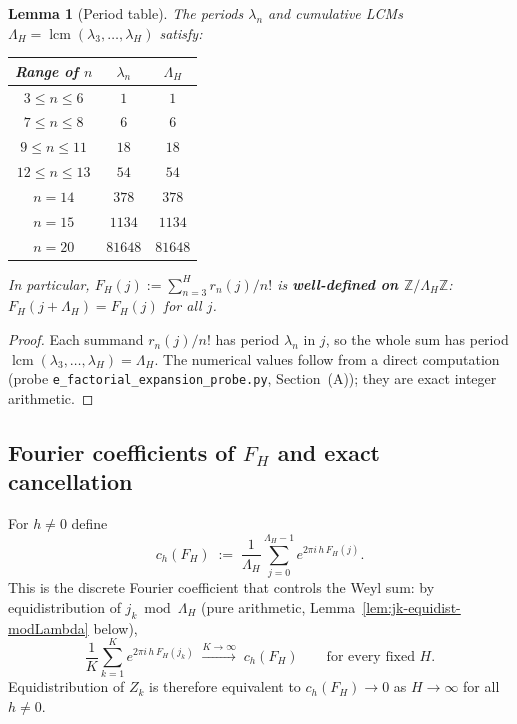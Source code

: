 \documentclass[
]{article}
\newtheorem{lemma}[theorem]{Lemma}
\begin{document}
\begin{lemma}[Period table]\label{lem:period-table}
The periods $\lambda_n$ and cumulative LCMs $\Lambda_H =
\operatorname{lcm}(\lambda_3,\ldots,\lambda_H)$ satisfy:

\begin{center}
\begin{tabular}{ccc}
\toprule
Range of $n$ & $\lambda_n$ & $\Lambda_H$ \\
\midrule
$3\le n\le 6$  & $1$  & $1$    \\
$7\le n\le 8$  & $6$  & $6$    \\
$9\le n\le 11$ & $18$ & $18$   \\
$12\le n\le 13$& $54$ & $54$   \\
$n=14$         & $378$& $378$  \\
$n=15$         & $1134$& $1134$\\
$n=20$         & $81648$& $81648$\\
\bottomrule
\end{tabular}
\end{center}

In particular, $F_H(j) := \sum_{n=3}^{H} r_n(j)/n!$ is
\textbf{well-defined on $\mathbb{Z}/\Lambda_H\mathbb{Z}$}:
$F_H(j+\Lambda_H) = F_H(j)$ for all $j$.
\end{lemma}

\begin{proof}
Each summand $r_n(j)/n!$ has period $\lambda_n$ in $j$, so the whole
sum has period $\operatorname{lcm}(\lambda_3,\ldots,\lambda_H) = \Lambda_H$.
The numerical values follow from a direct computation
(probe \texttt{e\_factorial\_expansion\_probe.py}, Section~(A));
they are exact integer arithmetic.
\end{proof}

\subsection{Fourier coefficients of $F_H$ and exact cancellation}
\label{sec:fourier-fH}

For $h\ne 0$ define
\begin{equation}\label{eq:fourier-fH-def}
  c_h(F_H) \;:=\; \frac{1}{\Lambda_H}\sum_{j=0}^{\Lambda_H-1}
    e^{2\pi i\,h\,F_H(j)}.
\end{equation}
This is the discrete Fourier coefficient that controls the Weyl sum:
by equidistribution of $j_k\bmod\Lambda_H$ (pure arithmetic,
Lemma~\ref{lem:jk-equidist-modLambda} below),
\[
  \frac{1}{K}\sum_{k=1}^K e^{2\pi i\,h\,F_H(j_k)}
  \;\xrightarrow{K\to\infty}\; c_h(F_H)
  \qquad\text{for every fixed }H.
\]
Equidistribution of $Z_k$ is therefore equivalent to
$c_h(F_H)\to 0$ as $H\to\infty$ for all $h\ne 0$.
\end{document}
